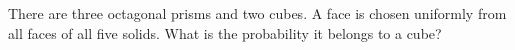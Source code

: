 There are three octagonal prisms and two cubes. A face is chosen uniformly from all faces of all five solids. What is the probability it belongs to a cube?
